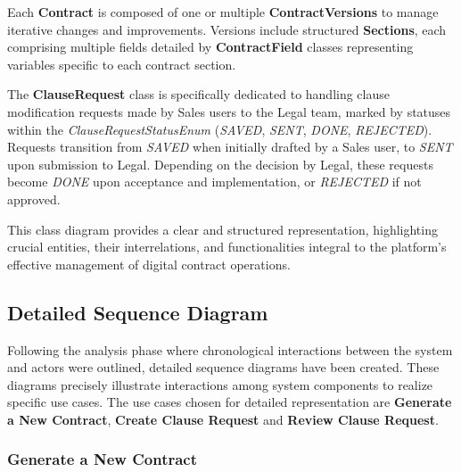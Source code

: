 Each \textbf{Contract} is composed of one or multiple \textbf{ContractVersions} to manage iterative changes and improvements. Versions include structured \textbf{Sections}, each comprising multiple fields detailed by \textbf{ContractField} classes representing variables specific to each contract section.\mynewline

The \textbf{ClauseRequest} class is specifically dedicated to handling clause modification requests made by Sales users to the Legal team, marked by statuses within the \textit{ClauseRequestStatusEnum} (\textit{SAVED}, \textit{SENT}, \textit{DONE}, \textit{REJECTED}). Requests transition from \textit{SAVED} when initially drafted by a Sales user, to \textit{SENT} upon submission to Legal. Depending on the decision by Legal, these requests become \textit{DONE} upon acceptance and implementation, or \textit{REJECTED} if not approved.\mynewline

This class diagram provides a clear and structured representation, highlighting crucial entities, their interrelations, and functionalities integral to the platform’s effective management of digital contract operations.


\subsection{Detailed Sequence Diagram}
Following the analysis phase where chronological interactions between the system and actors were outlined, detailed sequence diagrams have been created. These diagrams precisely illustrate interactions among system components to realize specific use cases. The use cases chosen for detailed representation are \textbf{Generate a New Contract}, \textbf{Create Clause Request} and \textbf{Review Clause Request}.

\subsubsection{Generate a New Contract}

